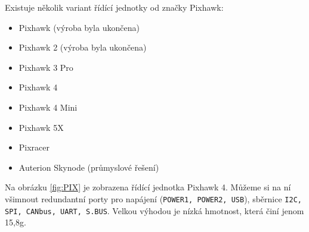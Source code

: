 Existuje několik variant řídící jednotky od značky Pixhawk:

\begin{itemize}
    \item Pixhawk (výroba byla ukončena)
    \item Pixhawk 2 (výroba byla ukončena)
    \item Pixhawk 3 Pro
    \item Pixhawk 4
    \item Pixhawk 4 Mini
    \item Pixhawk 5X
    \item Pixracer
    \item Auterion Skynode (průmyslové řešení)
\end{itemize}

Na obrázku \ref{fig:PIX} je zobrazena řídící jednotka Pixhawk 4. Můžeme si na ní všimnout redundantní porty pro napájení (\texttt{POWER1, POWER2, USB}), sběrnice \texttt{I2C, SPI, CANbus, UART, S.BUS}. Velkou výhodou je nízká hmotnost, která činí jenom 15,8g. \cite{PX4docs} %

